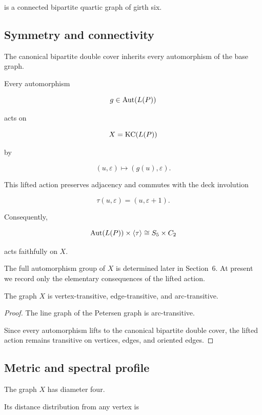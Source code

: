 is a connected bipartite quartic graph of girth six.


\subsection{Symmetry and connectivity}

The canonical bipartite double cover inherits every automorphism of the
base graph.

Every automorphism

\[
g\in\operatorname{Aut}(L(P))
\]

acts on

\[
X=\operatorname{KC}(L(P))
\]

by

\[
(u,\varepsilon)
\longmapsto
(g(u),\varepsilon).
\]

This lifted action preserves adjacency and commutes with the deck
involution

\[
\tau(u,\varepsilon)
=
(u,\varepsilon+1).
\]

Consequently,

\[
\operatorname{Aut}(L(P))
\times
\langle\tau\rangle
\cong
S_{5}\times C_{2}
\]

acts faithfully on \(X\).

The full automorphism group of \(X\) is determined later in
Section~6. At present we record only the elementary consequences of the
lifted action.

\begin{proposition}

The graph \(X\) is vertex-transitive, edge-transitive, and arc-transitive.

\end{proposition}

\begin{proof}

The line graph of the Petersen graph is arc-transitive.

Since every automorphism lifts to the canonical bipartite double cover,
the lifted action remains transitive on vertices, edges, and oriented
edges.

\end{proof}


\subsection{Metric and spectral profile}

The graph \(X\) has diameter four.

Its distance distribution from any vertex is

